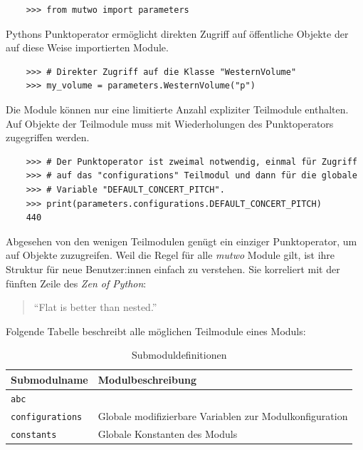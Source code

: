 \documentclass[12pt,a4paper,ngerman]{article}
\begin{document}
\lstset{language=Python}

\begin{lstlisting}
    >>> from mutwo import parameters
\end{lstlisting}

Pythons Punktoperator ermöglicht direkten Zugriff auf öffentliche Objekte der auf diese Weise importierten Module.

\lstset{language=Python}

\begin{lstlisting}
    >>> # Direkter Zugriff auf die Klasse "WesternVolume"
    >>> my_volume = parameters.WesternVolume("p")
\end{lstlisting}

Die Module können nur eine limitierte Anzahl expliziter Teilmodule enthalten.
Auf Objekte der Teilmodule muss mit Wiederholungen des Punktoperators zugegriffen werden.

\lstset{language=Python}

\begin{lstlisting}
    >>> # Der Punktoperator ist zweimal notwendig, einmal für Zugriff
    >>> # auf das "configurations" Teilmodul und dann für die globale
    >>> # Variable "DEFAULT_CONCERT_PITCH".
    >>> print(parameters.configurations.DEFAULT_CONCERT_PITCH)
    440
\end{lstlisting}

Abgesehen von den wenigen Teilmodulen genügt ein einziger Punktoperator, um auf Objekte zuzugreifen.
Weil die Regel für alle \emph{mutwo} Module gilt, ist ihre Struktur für neue Benutzer:innen einfach zu verstehen.
Sie korreliert mit der fünften Zeile des \emph{Zen of Python}:

\begin{quote}
    ``Flat is better than nested.''~\parencite{theZenOfPython}
\end{quote}

Folgende Tabelle beschreibt alle möglichen Teilmodule eines Moduls:

\begin{table}[H]
    \begin{center}
        \begin{tabular}{l l} 
            \hline
            Submodulname & Modulbeschreibung \\ [0.5ex] 
            \hline\hline
            \texttt{abc} & \emph{\nameref{abstractBaseClasses}} \\  %
            \texttt{configurations} & Globale modifizierbare Variablen zur Modulkonfiguration \\
            \texttt{constants} & Globale Konstanten des Moduls \\
            \hline
        \end{tabular}
    \end{center}

    \caption{Submoduldefinitionen}
\end{table}
\end{document}

